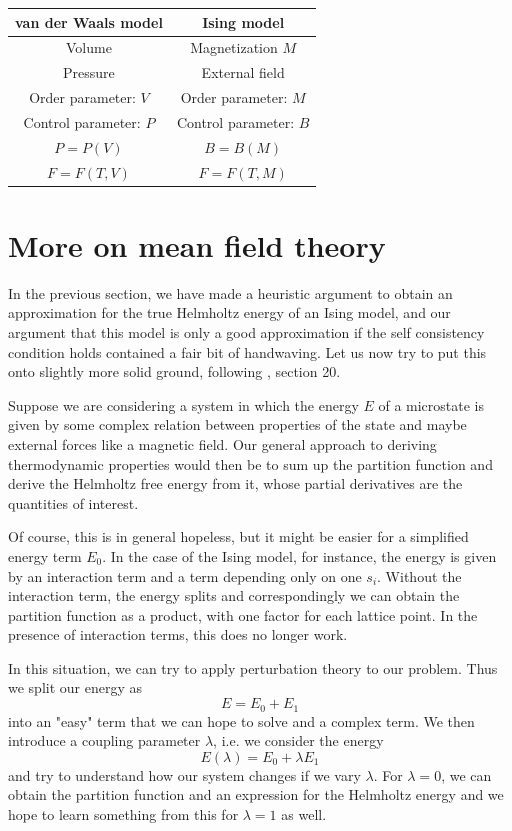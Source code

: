 \documentclass[a4paper, draft]{article}
\theoremstyle{own}
\theoremstyle{remark}
\begin{document}
\begin{table}	
\centering
\begin{tabular}{c|c}
	\hline\hline
{\bf van der Waals model} & {\bf Ising model}  \\
	\hline
Volume 	&  Magnetization $M$ \\
	\hline
Pressure	& External field \\
	\hline
Order parameter: $V$ &  Order parameter: $M$ \\
\hline 
Control parameter: $P$ & Control parameter: $B$ \\
\hline
$P = P(V)$ & $B = B(M)$ \\
\hline
$F = F(T, V)$ & $F = F(T, M)$ \\
\hline
\end{tabular}
\end{table}

\section{More on mean field theory}

In the previous section, we have made a heuristic argument to obtain an approximation for the true Helmholtz energy of an Ising model, and our argument that this model is only a good approximation if the self consistency condition holds contained a fair bit of handwaving. Let us now try to put this onto slightly more solid ground, following \cite{Callen}, section 20.

Suppose we are considering a system in which the energy $E$ of a microstate is given by some complex relation between properties of the state and maybe external forces like a magnetic field. Our general approach to deriving thermodynamic properties would then be to sum up the partition function and derive the Helmholtz free energy from it, whose partial derivatives are the quantities of interest.

Of course, this is in general hopeless, but it might be easier for a simplified energy term $E_0$. In the case of the Ising model, for instance, the energy is given by an interaction term and a term depending only on one $s_i$. Without the interaction term, the energy splits and correspondingly we can obtain the partition function as a product, with one factor for each lattice point. In the presence of interaction terms, this does no longer work.

In this situation, we can try to apply perturbation theory to our problem. Thus we split our energy as
$$
E = E_0 + E_1
$$
into an "easy" term that we can hope to solve and a complex term. We then introduce a coupling parameter $\lambda$, i.e. we consider the energy
$$
E(\lambda) = E_0 + \lambda E_1
$$
and try to understand how our system changes if we vary $\lambda$. For $\lambda = 0$, we can obtain the partition function and an expression for the Helmholtz energy and we hope to learn something from this for $\lambda = 1$ as well.
\end{document}

